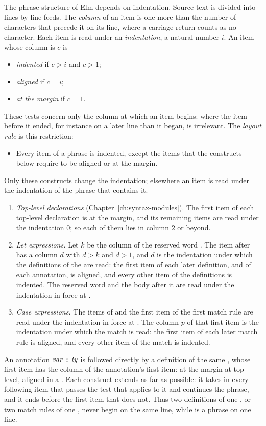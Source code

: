The phrase structure of Elm depends on indentation. Source text is divided
into lines by line feeds. The \emph{column} of an item is one more than the
number of characters that precede it on its line, where a carriage return
counts as no character.
Each item is read under an \emph{indentation}, a natural number $i$. An item
whose column is $c$ is
\begin{itemize}
\item \emph{indented} if $c > i$ and $c > 1$;
\item \emph{aligned} if $c = i$;
\item \emph{at the margin} if $c = 1$.
\end{itemize}
These tests concern only the column at which an item begins: where the item
before it ended, for instance on a later line than it began, is irrelevant.
The \emph{layout rule} is this restriction:
\begin{itemize}
\item{} Every item of a phrase is indented, except the
  items that the constructs below require to be aligned or at the margin.
\end{itemize}
Only these constructs change the indentation; elsewhere an item is read under the
indentation of the phrase that contains it.
\begin{enumerate}
\item \emph{Top-level declarations} (Chapter~\ref{ch:syntax-modules}). The
  first item of each top-level declaration is at the margin, and its remaining
  items are read under the indentation $0$; so each of them lies in column $2$
  or beyond.
\item \emph{Let expressions.} Let $k$ be the column of the reserved word
  . The item after  has a column $d$ with $d > k$ and $d > 1$,
  and $d$ is the indentation under which the definitions of the  are
  read: the first item of each later definition, and of each annotation, is
  aligned, and every other item of the definitions is indented. The reserved
  word  and the body after it are read under the indentation in force
  at .
\item \emph{Case expressions.} The items of  \expm{}  and the
  first item of the first match rule are read under the indentation in force
  at . The column $p$ of that first item is the indentation under
  which the match is read: the first item of each later match rule is
  aligned, and every other item of the match is indented.
\end{enumerate}
An annotation $\mathit{var}\ \textnormal{\texttt{:}}\ \mathit{ty}$ is followed directly by a definition of the
same \var, whose first item has the column of the annotation's first item: at
the margin at top level, aligned in a .
Each construct extends as far as possible: it takes in every following item
that passes the test that applies to it and continues the phrase, and it ends
before the first item that does not. Thus two definitions of one , or
two match rules of one , never begin on the same line, while
 is a phrase on one line.

